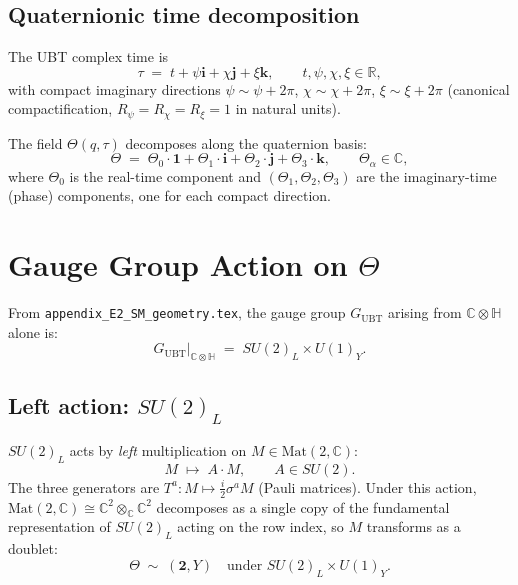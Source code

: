 \documentclass[12pt,a4paper]{article}
\theoremstyle{definition}
\theoremstyle{remark}
\newcommand{\C}{\mathbb{C}}
\newcommand{\R}{\mathbb{R}}
\renewcommand{\H}{\mathbb{H}}
\begin{document}
\subsection{Quaternionic time decomposition}

The UBT complex time is
\begin{equation}
  \tau \;=\; t + \psi\mathbf{i} + \chi\mathbf{j} + \xi\mathbf{k},
  \qquad t,\psi,\chi,\xi \in \R,
  \label{eq:quat_time}
\end{equation}
with compact imaginary directions $\psi \sim \psi+2\pi$, $\chi \sim \chi+2\pi$,
$\xi \sim \xi+2\pi$ (canonical compactification, $R_\psi = R_\chi = R_\xi = 1$
in natural units).

The field $\Theta(q,\tau)$ decomposes along the quaternion basis:
\begin{equation}
  \Theta \;=\; \Theta_0 \cdot \mathbf{1}
             + \Theta_1 \cdot \mathbf{i}
             + \Theta_2 \cdot \mathbf{j}
             + \Theta_3 \cdot \mathbf{k},
  \qquad \Theta_\alpha \in \C,
  \label{eq:quat_decomp}
\end{equation}
where $\Theta_0$ is the real-time component and $(\Theta_1, \Theta_2, \Theta_3)$
are the imaginary-time (phase) components, one for each compact direction.

\section{Gauge Group Action on $\Theta$}
\label{sec:gauge}

From \texttt{appendix\_E2\_SM\_geometry.tex}, the gauge group $G_\mathrm{UBT}$
arising from $\C \otimes \H$ alone is:
\begin{equation}
  G_\mathrm{UBT}\big|_{\C \otimes \H}
  \;=\; SU(2)_L \times U(1)_Y.
  \label{eq:gauge_group}
\end{equation}

\subsection{Left action: $SU(2)_L$}

$SU(2)_L$ acts by \emph{left} multiplication on $M \in \mathrm{Mat}(2,\C)$:
\begin{equation}
  M \;\longmapsto\; A \cdot M, \qquad A \in SU(2).
  \label{eq:SU2_action}
\end{equation}
The three generators are $T^a: M \mapsto \frac{i}{2}\sigma^a M$ (Pauli matrices).
Under this action, $\mathrm{Mat}(2,\C) \cong \C^2 \otimes_\C \C^2$ decomposes
as a single copy of the fundamental representation of $SU(2)_L$ acting on the
row index, so $M$ transforms as a doublet:
\begin{equation}
  \Theta \;\sim\; (\mathbf{2}, Y)
  \quad \text{under } SU(2)_L \times U(1)_Y.
  \label{eq:doublet}
\end{equation}
\end{document}
